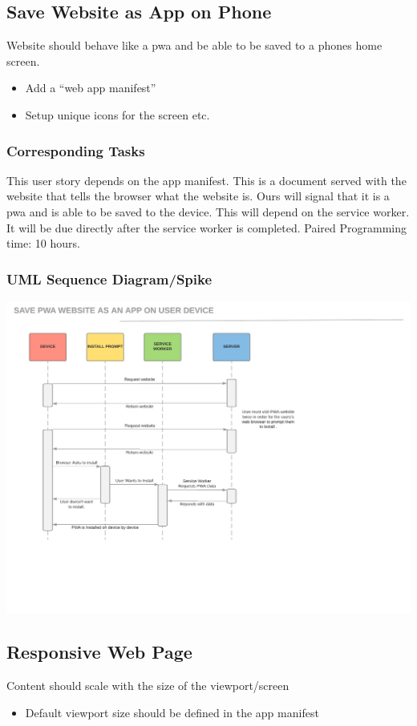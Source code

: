 \documentclass[12pt]{article}
\begin{document}
\subsection{Save Website as App on Phone}
Website should behave like a pwa and be able to be saved to a phones home screen.
\begin{itemize}
  \item Add a “web app manifest”
  \item Setup unique icons for the screen etc.
\end{itemize}
\subsubsection{Corresponding Tasks}
	This user story depends on the app manifest.  This is a document served with the website that tells the browser what the website is.  Ours will signal that it is a pwa and is able to be saved to the device.  This will depend on the service worker.  It will be due directly after the service worker is completed. Paired Programming time: 10 hours.
\subsubsection{UML Sequence Diagram/Spike}
\includegraphics[scale=0.5]{img/15.png}\linebreak

\subsection{Responsive Web Page}
Content should scale with the size of the viewport/screen
\begin{itemize}
  \item Default viewport size should be defined in the app manifest
\end{itemize}
\end{document}

